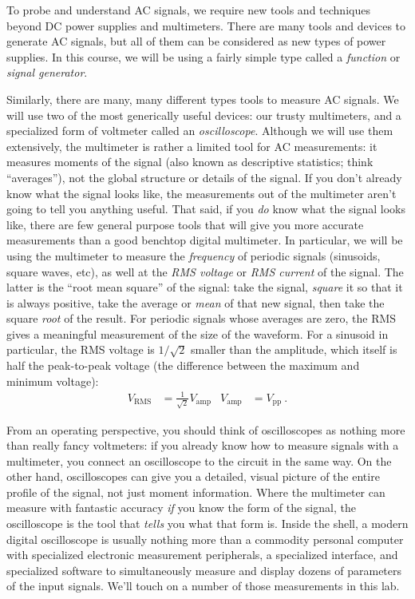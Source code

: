 \documentclass[12pt]{article}
\begin{document}
To probe and understand AC signals, we require new tools and
techniques beyond DC power supplies and multimeters.  There are many
tools and devices to generate AC signals, but all of them can be
considered as new types of power supplies.  In this course, we will be
using a fairly simple type called a \textit{function} or
\textit{signal generator}.

Similarly, there are many, many different types tools to measure AC
signals.  We will use two of the most generically useful devices: our
trusty multimeters, and a specialized form of voltmeter called an
\textit{oscilloscope}.  Although we will use them extensively, the
multimeter is rather a limited tool for AC measurements: it measures
moments of the signal (also known as descriptive statistics; think
``averages''), not the global structure or details of the signal.  If
you don't already know what the signal looks like, the measurements
out of the multimeter aren't going to tell you anything useful.  That
said, if you \textit{do} know what the signal looks like, there are
few general purpose tools that will give you more accurate
measurements than a good benchtop digital multimeter.  In particular,
we will be using the multimeter to measure the \textit{frequency} of
periodic signals (sinusoids, square waves, etc), as well at the
\textit{RMS voltage} or \textit{RMS current} of the signal.  The
latter is the ``root mean square'' of the signal: take the signal,
\textit{square} it so that it is always positive, take the average or
\textit{mean} of that new signal, then take the square \textit{root}
of the result.  For periodic signals whose averages are zero, the RMS
gives a meaningful measurement of the size of the waveform.  For a
sinusoid in particular, the RMS voltage is $1/\sqrt{2}$ smaller than
the amplitude, which itself is half the peak-to-peak voltage (the
difference between the maximum and minimum voltage):
\begin{align*}
  V_\text{RMS} &= \frac{1}{\sqrt{2}} V_\text{amp} & V_\text{amp} &= V_\text{pp}\ . 
\end{align*}

From an operating perspective, you should think of oscilloscopes as
nothing more than really fancy voltmeters: if you already know how to
measure signals with a multimeter, you connect an oscilloscope to the
circuit in the same way.  On the other hand, oscilloscopes can give
you a detailed, visual picture of the entire profile of the signal, not
just moment information.  Where the multimeter can measure with
fantastic accuracy \textit{if} you know the form of the signal, the
oscilloscope is the tool that \textit{tells} you what that form is.
Inside the shell, a modern digital oscilloscope is usually nothing
more than a commodity personal computer with specialized electronic
measurement peripherals, a specialized interface, and specialized
software to simultaneously measure and display dozens of parameters of
the input signals.  We'll touch on a number of those measurements in
this lab.
\end{document}
